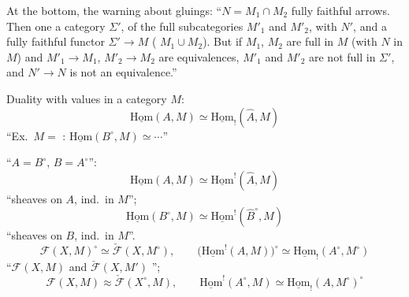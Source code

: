 \documentclass[11pt,a4paper]{article}
\begin{document}
At the bottom, the warning about gluings:
``$N = M_{1} \cap M_{2}$  fully faithful arrows. Then one
 a category $\Sigma'$,  of the full
subcategories $M'_{1}$ and $M'_{2}$, with  $N'$,
and a fully faithful functor $\Sigma' \to M$ (
$M_{1} \cup M_{2}$). But  if $M_{1}$, $M_{2}$ are full in
$M$ (with $N$ \ill{} in $M$) and $M'_{1} \to M_{1}$, $M'_{2} \to M_{2}$
are equivalences, $M'_{1}$ and $M'_{2}$ are not \ill{} \ill{} full in
$\Sigma'$, and $N' \to N$ is not \ill{} an equivalence.''

Duality with values in a category $M$:
\[
\underline{\mathrm{Hom}}(A, M)
\simeq \underline{\mathrm{Hom}}_{!}(\widehat{A}, M)
\]
``Ex.\ $M = $ \ill{}: $\underline{\mathrm{Hom}}(B^{\circ}, M) \simeq \cdots$''

``$A = B^{\circ}$, $B = A^{\circ}$'':
\[
\underline{\mathrm{Hom}}(A, M) \simeq
\underline{\mathrm{Hom}}^{!}(\widehat{A}, M)
\]
``sheaves on $A$, ind.\ in $M$'';
\[
\underline{\mathrm{Hom}}(B^{\circ}, M) \simeq
\underline{\mathrm{Hom}}^{!}(\widehat{B}^{\circ}, M)
\]
``sheaves on $B$, ind.\ in $M$''.
\[
\mathcal{F}(X, M)^{\circ} \simeq \check{\mathcal{F}}(X, M^{\circ}),
\qquad
\bigl(\underline{\mathrm{Hom}}^{!}(A, M)\bigr)^{\circ}
\simeq \underline{\mathrm{Hom}}_{!}(A^{\circ}, M^{\circ})
\]
``$\mathcal{F}(X,M)$ and $\check{\mathcal{F}}(X, M')$ '';
\[
\mathcal{F}(X, M) \approx \check{\mathcal{F}}(X^{\circ}, M),
\qquad
\underline{\mathrm{Hom}}^{!}(A^{\circ}, M)
\simeq \underline{\mathrm{Hom}}_{!}(A, M^{\circ})^{\circ}
\]
\end{document}
